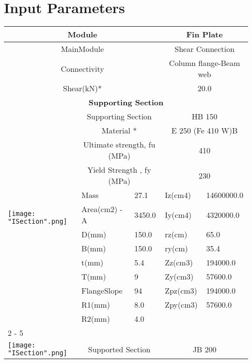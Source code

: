 \documentclass{article}%
\begin{document}
%
\normalsize%
\pagestyle{header}%
\section{Input Parameters}%
\label{sec:InputParameters}%
\renewcommand{\arraystretch}{1.2}%
\begin{longtable}{|p{5cm}|p{2cm}|p{2cm}|p{2cm}|p{5cm}|}%
\hline%
\hline%
\multicolumn{3}{|c|}{Module}&\multicolumn{2}{|c|}{Fin Plate}\\%
\hline%
\hline%
\multicolumn{3}{|c|}{MainModule}&\multicolumn{2}{|c|}{Shear Connection}\\%
\hline%
\hline%
\multicolumn{3}{|c|}{Connectivity}&\multicolumn{2}{|c|}{Column flange{-}Beam web}\\%
\hline%
\hline%
\multicolumn{3}{|c|}{Shear(kN)*}&\multicolumn{2}{|c|}{20.0}\\%
\hline%
\hline%
\multicolumn{5}{|c|}{\textbf{Supporting Section}}\\%
\hline%
\hline%
\multirow{13}{*}{\texttt{[image: "ISection".png]}}&\multicolumn{2}{|c|}{Supporting Section}&\multicolumn{2}{|c|}{HB 150}\\%
\cline{2%
-%
5}%
&\multicolumn{2}{|c|}{Material *}&\multicolumn{2}{|c|}{E 250 (Fe 410 W)B}\\%
\cline{2%
-%
5}%
&\multicolumn{2}{|c|}{Ultimate strength, fu (MPa)}&\multicolumn{2}{|c|}{410}\\%
\cline{2%
-%
5}%
&\multicolumn{2}{|c|}{Yield Strength , fy (MPa)}&\multicolumn{2}{|c|}{230}\\%
\cline{2%
-%
5}%
&Mass&27.1&Iz(cm4)&14600000.0\\%
\cline{2%
-%
5}%
&Area(cm2) {-} A&3450.0&Iy(cm4)&4320000.0\\%
\cline{2%
-%
5}%
&D(mm)&150.0&rz(cm)&65.0\\%
\cline{2%
-%
5}%
&B(mm)&150.0&ry(cm)&35.4\\%
\cline{2%
-%
5}%
&t(mm)&5.4&Zz(cm3)&194000.0\\%
\cline{2%
-%
5}%
&T(mm)&9&Zy(cm3)&57600.0\\%
\cline{2%
-%
5}%
&FlangeSlope&94&Zpz(cm3)&194000.0\\%
\cline{2%
-%
5}%
&R1(mm)&8.0&Zpy(cm3)&57600.0\\%
\cline{2%
-%
5}%
&R2(mm)&4.0&&\\%
\cline{2%
-%
5}%
\hline%
\multicolumn{5}{|c|}{\textbf{Supported Section}}\\%
\hline%
\hline%
\multirow{13}{*}{\texttt{[image: "ISection".png]}}&\multicolumn{2}{|c|}{Supported Section}&\multicolumn{2}{|c|}{JB 200}\\%

\end{longtable}
\end{document}
